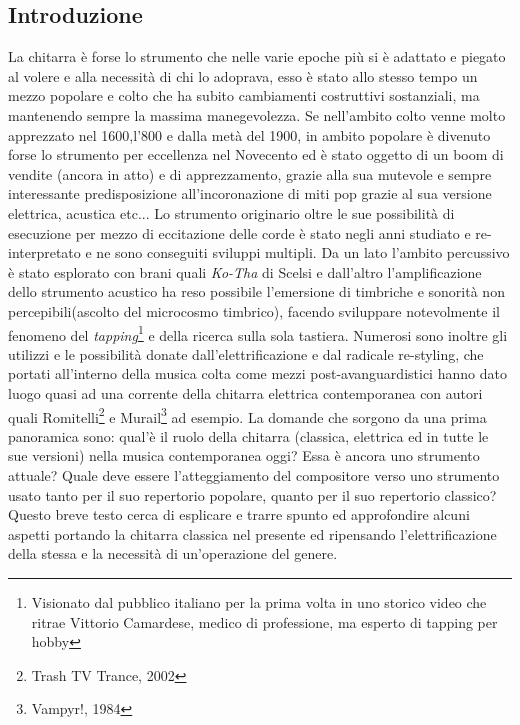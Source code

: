 \documentclass[oneside]{article}
\begin{document}
\newpage
\begin{multicols*}{2} %



\section{Introduzione}

La chitarra è forse lo strumento che nelle varie epoche più si è adattato e piegato al volere e alla necessità di chi lo adoprava, esso è stato allo stesso tempo un mezzo popolare e colto che ha subito cambiamenti costruttivi sostanziali, ma mantenendo sempre la massima manegevolezza. Se nell’ambito colto venne molto apprezzato nel 1600,l’800 e dalla metà del 1900, in ambito popolare è divenuto forse lo strumento per eccellenza nel Novecento ed è stato oggetto di un boom di vendite (ancora in atto) e di apprezzamento, grazie alla sua mutevole e sempre interessante predisposizione all’incoronazione di miti pop grazie al sua versione elettrica, acustica etc... Lo strumento originario oltre le sue possibilità di esecuzione per mezzo di eccitazione delle corde è stato negli anni studiato e re-interpretato e ne sono conseguiti sviluppi multipli. Da un lato l’ambito percussivo è stato esplorato con brani quali \textit{Ko-Tha} di Scelsi e dall’altro l’amplificazione dello strumento acustico ha reso possibile l’emersione di timbriche e sonorità non percepibili(ascolto del microcosmo timbrico), facendo sviluppare notevolmente il fenomeno del \textit{tapping}\footnote{Visionato dal pubblico italiano per la prima volta in uno storico video che ritrae Vittorio Camardese, medico di professione, ma esperto di tapping per hobby} e della ricerca sulla sola tastiera. Numerosi sono inoltre gli utilizzi e le possibilità donate dall’elettrificazione e dal radicale re-styling, che portati all’interno della musica colta come mezzi post-avanguardistici hanno dato luogo quasi ad una corrente della chitarra elettrica contemporanea con autori quali Romitelli\footnote{Trash TV Trance, 2002}  e Murail\footnote{Vampyr!, 1984}  ad esempio. 
La domande che sorgono da una prima panoramica sono: qual’è il ruolo della chitarra (classica, elettrica ed in tutte le sue versioni) nella musica contemporanea oggi? Essa è ancora uno strumento attuale? Quale deve essere l’atteggiamento del compositore verso uno strumento usato tanto per il suo repertorio popolare, quanto per il suo repertorio classico? Questo breve testo cerca di esplicare e trarre spunto ed approfondire alcuni aspetti portando la chitarra classica nel presente ed ripensando l’elettrificazione della stessa e la necessità di un’operazione del genere. 



\end{multicols*}
\end{document}

